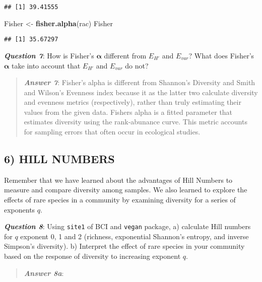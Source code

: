\documentclass[
]{article}
\newenvironment{Shaded}{\begin{snugshade}}{\end{snugshade}}
\newcommand{\FunctionTok}[1]{\textcolor[rgb]{0.13,0.29,0.53}{\textbf{#1}}}
\newcommand{\NormalTok}[1]{#1}
\newcommand{\OtherTok}[1]{\textcolor[rgb]{0.56,0.35,0.01}{#1}}
\begin{document}
\begin{verbatim}
## [1] 39.41555
\end{verbatim}

\begin{Shaded}
\begin{Highlighting}[]
\NormalTok{Fisher }\OtherTok{\textless{}{-}} \FunctionTok{fisher.alpha}\NormalTok{(rac)}
\NormalTok{Fisher}
\end{Highlighting}
\end{Shaded}

\begin{verbatim}
## [1] 35.67297
\end{verbatim}

\textbf{\emph{Question 7}}: How is Fisher's \(\boldsymbol\alpha\)
different from \(E_{H'}\) and \(E_{var}\)? What does Fisher's
\(\boldsymbol\alpha\) take into account that \(E_{H'}\) and \(E_{var}\)
do not?

\begin{quote}
\textbf{\emph{Answer 7}}: Fisher's alpha is different from Shannon's
Diversity and Smith and Wilson's Evenness index because it as the latter
two calculate diversity and evenness metrics (respectively), rather than
truly estimating their values from the given data. Fishers alpha is a
fitted parameter that estimates diversity using the rank-abunance curve.
This metric accounts for sampling errors that often occur in ecological
studies.
\end{quote}

\subsection{6) HILL NUMBERS}\label{hill-numbers}

Remember that we have learned about the advantages of Hill Numbers to
measure and compare diversity among samples. We also learned to explore
the effects of rare species in a community by examining diversity for a
series of exponents \(q\).

\textbf{\emph{Question 8}}: Using \texttt{site1} of BCI and
\texttt{vegan} package, a) calculate Hill numbers for \(q\) exponent 0,
1 and 2 (richness, exponential Shannon's entropy, and inverse Simpson's
diversity). b) Interpret the effect of rare species in your community
based on the response of diversity to increasing exponent \(q\).

\begin{quote}
\textbf{\emph{Answer 8a}}:
\end{quote}
\end{document}
